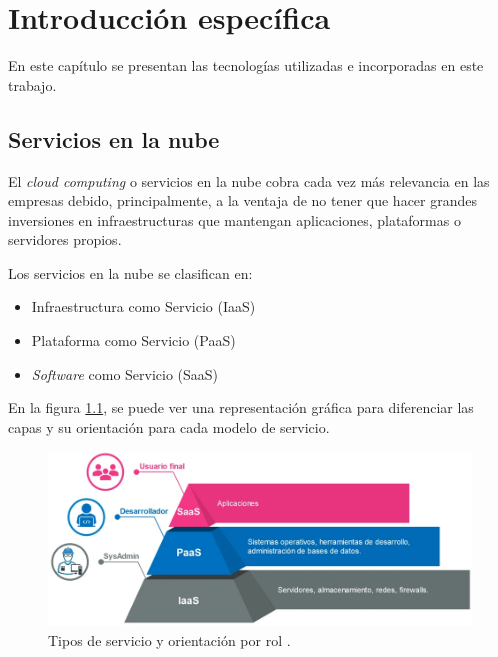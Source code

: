 \chapter{Introducción específica} %

\label{Chapter2}

En este capítulo se presentan las tecnologías utilizadas e incorporadas en este trabajo. 


\section{Servicios en la nube}
El \emph{cloud computing} o servicios en la nube cobra cada vez más relevancia en las empresas debido, principalmente, a la ventaja de no tener que hacer grandes inversiones en infraestructuras que mantengan aplicaciones, plataformas o servidores propios.

Los servicios en la nube se clasifican en:

\begin{itemize}
\item Infraestructura como Servicio (IaaS)
\item Plataforma como Servicio (PaaS)
\item \emph{Software} como Servicio (SaaS)
\end{itemize}

En la figura \ref{fig:servicios}, se puede ver una representación gráfica para diferenciar las capas y su orientación para cada modelo de servicio.


\begin{figure}[htbp]
	\centering
	\includegraphics[width=.9\textwidth]{./Figures/servicios.png}
	\caption{Tipos de servicio y orientación por rol \protect\footnotemark.}

	\label{fig:servicios}
\end{figure}

